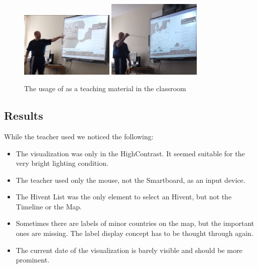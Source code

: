 \begin{figure}[ht]
  \begin{center}
    \includegraphics[width=0.4\textwidth]{graphics/teacher-2.png}
    \includegraphics[width=0.4\textwidth]{graphics/teacher-1.png}
  \end{center}
  \caption{The usage of \HG as a teaching material in the classroom}
  \label{fig:teacher}
\end{figure}


\subsection{Results} %
\label{sub:results-1}

While the teacher used \HG we noticed the following:

\begin{itemize}
  \item The visualization was only in the HighContrast. It seemed suitable for the very bright lighting condition.
  \item The teacher used only the mouse, not the Smartboard, as an input device.
  \item The Hivent List was the only element to select an Hivent, but not the Timeline or the Map.
  \item Sometimes there are labels of minor countries on the map, but the important ones are missing. The label display concept has to be thought through again.
  \item The current date of the visualization is barely visible and should be more prominent.
\end{itemize}

